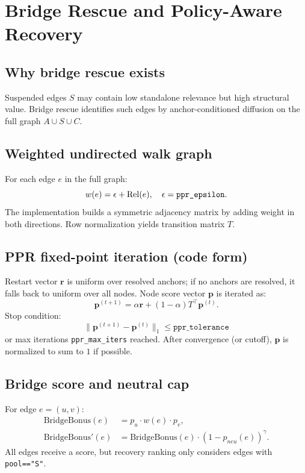 \section{Bridge Rescue and Policy-Aware Recovery}
\label{sec:bridge-recovery}

\subsection{Why bridge rescue exists}
Suspended edges $S$ may contain low standalone relevance but high structural value.
Bridge rescue identifies such edges by anchor-conditioned diffusion on the full graph $A\cup S\cup C$.

\subsection{Weighted undirected walk graph}
For each edge $e$ in the full graph:
\[
w(e)=\epsilon+\operatorname{Rel}(e),\quad \epsilon=\texttt{ppr\_epsilon}.
\]
The implementation builds a symmetric adjacency matrix by adding weight in both directions.
Row normalization yields transition matrix $T$.

\subsection{PPR fixed-point iteration (code form)}
Restart vector $\mathbf{r}$ is uniform over resolved anchors; if no anchors are resolved, it falls back to uniform over all nodes.
Node score vector $\mathbf{p}$ is iterated as:
\[
\mathbf{p}^{(t+1)} = \alpha\mathbf{r} + (1-\alpha)T^\top\mathbf{p}^{(t)}.
\]
Stop condition:
\[
\|\mathbf{p}^{(t+1)}-\mathbf{p}^{(t)}\|_1 \le \texttt{ppr\_tolerance}
\]
or max iterations \texttt{ppr\_max\_iters} reached.
After convergence (or cutoff), $\mathbf{p}$ is normalized to sum to $1$ if possible.

\subsection{Bridge score and neutral cap}
For edge $e=(u,v)$:
\begin{align}
\text{BridgeBonus}(e) &= p_u\cdot w(e)\cdot p_v, \\
\text{BridgeBonus}'(e) &= \text{BridgeBonus}(e)\cdot (1-p_{neu}(e))^{\gamma}.
\end{align}
All edges receive a score, but recovery ranking only considers edges with \texttt{pool=="S"}.

